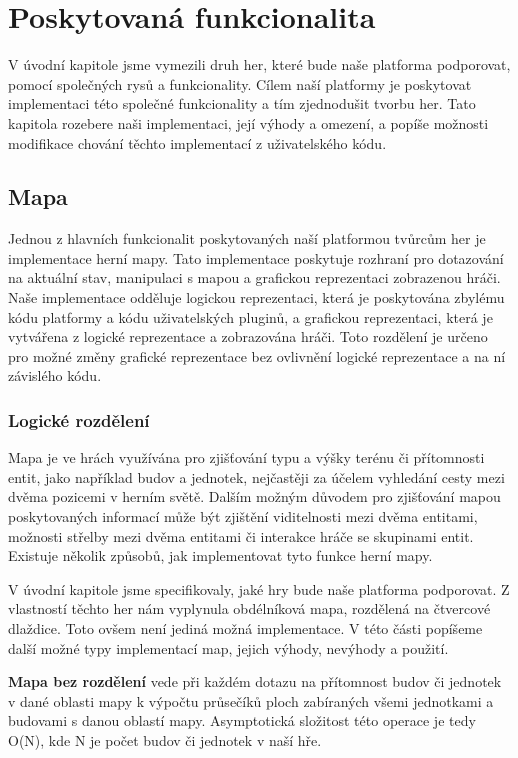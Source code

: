 \section{Poskytovaná funkcionalita}
V úvodní kapitole jsme vymezili druh her, které bude naše platforma podporovat, pomocí společných rysů a funkcionality. Cílem naší platformy je poskytovat implementaci této společné funkcionality a tím zjednodušit tvorbu her. Tato kapitola rozebere naši implementaci, její výhody a omezení, a popíše možnosti modifikace chování těchto implementací z uživatelského kódu.

\subsection{Mapa}
\label{sec:mapimpl}
Jednou z hlavních funkcionalit poskytovaných naší platformou tvůrcům her je implementace herní mapy. Tato implementace poskytuje rozhraní pro dotazování na aktuální stav, manipulaci s mapou a grafickou reprezentaci zobrazenou hráči. Naše implementace odděluje logickou reprezentaci, která je poskytována zbylému kódu platformy a kódu uživatelských pluginů, a grafickou reprezentaci, která je vytvářena z logické reprezentace a zobrazována hráči. Toto rozdělení je určeno pro možné změny grafické reprezentace bez ovlivnění logické reprezentace a na ní závislého kódu. 

\subsubsection{Logické rozdělení}
\label{sec:maplogic}
Mapa je ve hrách využívána pro zjišťování typu a výšky terénu či přítomnosti entit, jako například budov a jednotek, nejčastěji za účelem vyhledání cesty mezi dvěma pozicemi v herním světě. Dalším možným důvodem pro zjišťování mapou poskytovaných informací může být zjištění viditelnosti mezi dvěma entitami, možnosti střelby mezi dvěma entitami či interakce hráče se skupinami entit.  Existuje několik způsobů, jak implementovat tyto funkce herní mapy.

V úvodní kapitole jsme specifikovaly, jaké hry bude naše platforma podporovat. Z vlastností těchto her nám vyplynula obdélníková mapa, rozdělená na čtvercové dlaždice. Toto ovšem není jediná možná implementace. V této části popíšeme další možné typy implementací map, jejich výhody, nevýhody a použití.

\textbf{Mapa bez rozdělení} vede při každém dotazu na přítomnost budov či jednotek v dané oblasti mapy k výpočtu průsečíků ploch zabíraných všemi jednotkami a budovami s danou oblastí mapy. Asymptotická složitost této operace je tedy O(N), kde N je počet budov či jednotek v naší hře.

